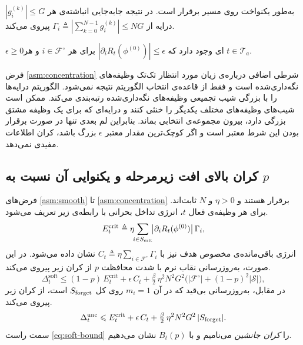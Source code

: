 \begin{assumption}
	\label{asm:bounded}
	$|g^{(k)}_i|\leq G$ به‌طور یکنواخت روی مسیر برقرار است. در نتیجه جابه‌جایی انباشته‌ی هر درایه از $\Gamma_i\triangleq|\sum_{k=0}^{N-1}g^{(k)}_i|\leq NG$ پیروی می‌کند.
\end{assumption}

\begin{assumption}
	\label{asm:concentration}
	$\epsilon\geq 0$ای وجود دارد که $|\partial_i R_t(\phi^{(0)})|\leq\epsilon$ برای هر $i\in\mathcal{F}^{\circ}$ و هر $t\in\mathcal{T}_a$.
\end{assumption}

فرض \ref{asm:concentration} شرطی اضافی درباره‌ی زیان مورد انتظار تک‌تک وظیفه‌های نگه‌داری‌شده است و فقط از قاعده‌ی انتخاب الگوریتم نتیجه نمی‌شود. الگوریتم درایه‌ها را با بزرگی شیب تجمیعی وظیفه‌های نگه‌داری‌شده رتبه‌بندی می‌کند. ممکن است شیب‌های وظیفه‌های مختلف یکدیگر را خنثی کنند و درایه‌ای که برای یک وظیفه مشتق بزرگی دارد، بیرون مجموعه‌ی انتخابی بماند. بنابراین لم بعدی تنها در صورت برقرار بودن این شرط معتبر است و اگر کوچک‌ترین مقدار معتبر $\epsilon$ بزرگ باشد، کران اطلاعات مفیدی نمی‌دهد.

\subsection{کران بالای افت زیرمرحله و یکنوایی آن نسبت به \texorpdfstring{$p$}{p}}
\label{subsec:prop-theory-prop}

\begin{lemma}
	\label{lem:subphase}
	فرض‌های \ref{asm:smooth} تا \ref{asm:concentration} برقرار هستند و $\eta>0$ و $N$ ثابت‌اند. برای هر وظیفه‌ی فعال $t$، {انرژی تداخل بحرانی} با رابطه‌ی زیر تعریف می‌شود.
	\begin{equation}
		\label{eq:Ecrit}
		E^{\mathrm{crit}}_{t} \triangleq \eta\!\!\sum_{i\in S_{\mathrm{crit}}}\!\!\big|\partial_i R_t(\phi^{(0)})\big|\,\Gamma_i ,
	\end{equation}
	انرژی باقی‌مانده‌ی مخصوص هدف نیز با $C_t\triangleq\eta\sum_{i\in\mathcal{F}^{\circ}}\Gamma_i$ نشان داده می‌شود. در این صورت، به‌روزرسانی نقاب نرم با شدت محافظت $p$ از کران زیر پیروی می‌کند.
	\begin{equation}
		\label{eq:soft-bound}
		\Delta_t^{\mathrm{soft}} \leq (1-p)\,E^{\mathrm{crit}}_t + \epsilon\,C_t + \tfrac{\beta}{2}\,\eta^2 N^2 G^2\Big(|\mathcal{F}^{\circ}| + (1-p)^2|\mathcal{S}|\Big),
	\end{equation}
	در مقابل، به‌روزرسانی بی‌قید که در آن $m_i=1$ روی کل $S_{\mathrm{forget}}$ است، از کران زیر پیروی می‌کند.
	\begin{equation}
		\label{eq:unc-bound}
		\Delta_t^{\mathrm{unc}} \leqslant E^{\mathrm{crit}}_t + \epsilon\,C_t + \tfrac{\beta}{2}\,\eta^2 N^2 G^2\,|S_{\mathrm{forget}}| .
	\end{equation}
	سمت راست \eqref{eq:soft-bound} را \emph{کران جانشین} می‌نامیم و با $B_t(p)$ نشان می‌دهیم.
\end{lemma}

